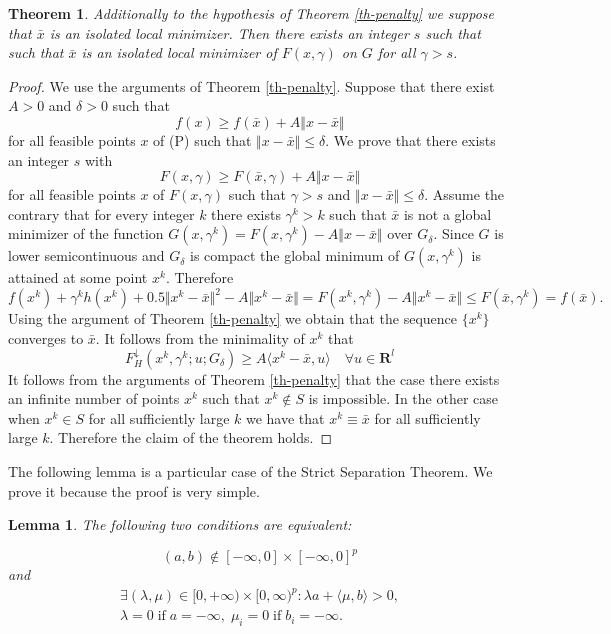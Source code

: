 \documentclass[12pt]{article}
\newtheorem{theorem}{Theorem}[section]
\newtheorem{lemma}{Lemma}[section]
\def\E{\mathbf R^l}
\def\ld#1{#1^{\downarrow}_{H}}
\newcommand{\scalpr}[2]{\langle#1,#2\rangle}
\newcommand{\norm}[1]{\Vert#1\Vert}
\begin{document}
\begin{theorem}
\label{th4.2}
Additionally to the hypothesis of Theorem \ref{th-penalty} we suppose that
$\bar x$ is an isolated local minimizer. Then there exists an integer $s$
such that such that $\bar x$ is an isolated local minimizer of $F(x,\gamma)$
on $G$ for all $\gamma>s$.
\end{theorem}
\begin{proof}
We use the arguments of Theorem \ref{th-penalty}. Suppose that there exist
$A>0$ and $\delta>0$ such that
\[
f(x)\ge f(\bar x)+A\norm{x-\bar x}
\]
for all feasible points $x$ of (P) such that $\norm{x-\bar x}\le\delta$.
We prove that there exists an integer $s$ with
\[
F(x,\gamma)\ge F(\bar x,\gamma)+A\norm{x-\bar x}
\]
for all feasible points $x$ of $F(x,\gamma)$ such that $\gamma>s$ and $\norm{x-\bar x}\le\delta$.
Assume the contrary that for every integer $k$ there exists $\gamma^k>k$
such that $\bar x$ is not a global minimizer of the function
$G(x,\gamma^k)=F(x,\gamma^k)-A\norm{x-\bar x}$ over $G_\delta$.
Since $G$ is lower semicontinuous and $G_\delta$ is compact the global
minimum of $G(x,\gamma^k)$ is attained at some point $x^k$. Therefore
\[
f(x^k)+\gamma^k h(x^k)+0.5\norm{x^k-\bar x}^2-A\norm{x^k-\bar x}
=F(x^k,\gamma^k)-A\norm{x^k-\bar x}\le F(\bar x,\gamma^k)=f(\bar x).
\]
Using the argument of Theorem \ref{th-penalty} we obtain that the sequence
$\{x^k\}$ converges to $\bar x$. It follows from the minimality of $x^k$
that
\[
\ld F(x^k,\gamma^k;u;G_\delta)\ge A\scalpr{x^k-\bar x}{u}\quad\forall u\in \E
\]
It follows from the arguments of Theorem \ref{th-penalty} that the case
there exists an infinite number of points $x^k$ such that $x^k\notin S$
is impossible. In the other case when $x^k\in S$ for all sufficiently large $k$
we have that $x^k\equiv\bar x$ for all sufficiently large $k$.
Therefore the claim of the theorem holds.
\end{proof}

The following lemma is a particular case of the Strict Separation Theorem. We prove it because the proof is very simple.

\begin{lemma}\label{lema1}
The following two conditions are equivalent:

\begin{equation}\label{14}
(a,b)\notin [-\infty,0]\times [-\infty,0]^p
\end{equation}
and
\begin{equation}\label{15}
\begin{array}{r}
\exists (\lambda,\mu)\in[0,+\infty)\times[0,\infty)^p: \lambda a+\scalpr{\mu}{b}>0,\\
\lambda=0\; \textrm{if}\; a=-\infty,
\; \mu_i=0\;\textrm{if}\; b_i=-\infty.
\end{array}\end{equation}
\end{lemma}
\end{document}
